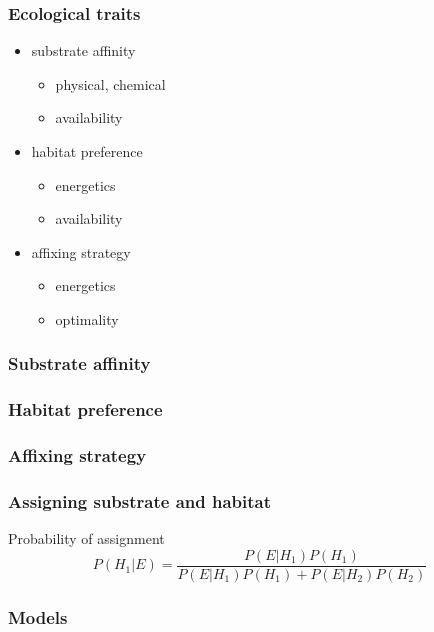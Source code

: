 \documentclass{beamer}
\begin{document}
\begin{frame}
  \frametitle{Ecological traits}
  \begin{itemize}
    \item substrate affinity
      \begin{itemize}
        \item physical, chemical
        \item availability
      \end{itemize}
    \item habitat preference
      \begin{itemize}
        \item energetics
        \item availability
      \end{itemize}
    \item affixing strategy
      \begin{itemize}
        \item energetics
        \item optimality
      \end{itemize}
  \end{itemize}
\end{frame}

\begin{frame}
  \frametitle{Substrate affinity}
\end{frame}

\begin{frame}
  \frametitle{Habitat preference}
\end{frame}

\begin{frame}
  \frametitle{Affixing strategy}
\end{frame}

\begin{frame}
  \frametitle{Assigning substrate and habitat}

  \begin{block}{Probability of assignment}
    \begin{equation}
      P(H_{1}|E) = \frac{P(E|H_{1})P(H_{1})}{P(E|H_{1})P(H_{1}) + P(E|H_{2})P(H_{2})}
      \label{eq:aff}
    \end{equation}
  \end{block}
\end{frame}

\begin{frame}
  \frametitle{Models}
\end{frame}
\end{document}
